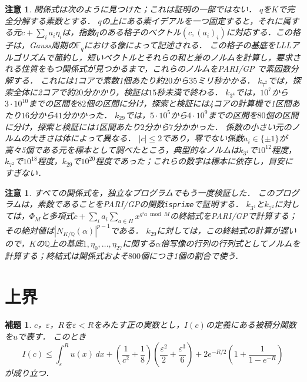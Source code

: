 \documentclass[11pt,a4paper]{ltjsarticle}
\theoremstyle{ja}
\newtheorem{lemma}[theorem]{補題}
\newtheorem{remark}[theorem]{注意}
\begin{document}
\begin{remark} \label{rem:search}
関係式は次のように見つけた；これは証明の一部ではない．
$q$を$K$で完全分解する素数とする．
$q$の上にある素イデアルを一つ固定すると，それに属する元$c + \sum_i a_i \eta_i$は，指数$q$のある格子のベクトル$(c, (a_i)_i)$に対応する．この格子は，Gauss周期の$\mathbb{F}_q$における像によって記述される．
この格子の基底をLLLアルゴリズムで簡約し，短いベクトルとそれらの和と差のノルムを計算し，要求される性質をもつ関係式が見つかるまで，これらのノルムをPARI/GP \cite{PARI}で素因数分解する．
これには1コアで素数1個あたり約$20$から$35$ミリ秒かかる．
$k_{7^2}$では，探索全体に2コアで約$20$分かかり，検証は$15$秒未満で終わる．
$k_{3^4}$では，$10^7$から$3 \cdot 10^{10}$までの区間を$82$個の区間に分け，探索と検証には4コアの計算機で1区間あたり$16$分から$41$分かかった．
$k_{29}$では，$5 \cdot 10^5$から$4 \cdot 10^9$までの区間を$80$個の区間に分け，探索と検証には1区間あたり$2$分から$7$分かかった．
係数の小さい元のノルムの大きさは体によって異なる．
$|c| \le 2$であり，零でない係数$a_i \in \{\pm 1\}$が高々5個である元を標本として調べたところ，典型的なノルムは$k_{3^4}$で$10^{12}$程度，$k_{7^2}$で$10^{18}$程度，$k_{29}$で$10^{20}$程度であった；これらの数字は標本に依存し，目安にすぎない．
\end{remark}

\begin{remark} \label{rem:second}
すべての関係式を，独立なプログラムでもう一度検証した．
このプログラムは，素数であることをPARI/GPの関数\texttt{isprime}で証明する．
$k_{3^4}$と$k_{7^2}$に対しては，$\Phi_M$と多項式$c + \sum_i a_i \sum_{a \in H} x^{g^i a \bmod M}$の終結式をPARI/GPで計算する；その絶対値は$|N_{K/\mathbb{Q}}(\alpha)|^{p-1}$である．
$k_{29}$に対しては，この終結式の計算が遅いので，$K$の$\mathbb{Q}$上の基底$1, \eta_0, \ldots, \eta_{27}$に関する$\alpha$倍写像の行列の行列式としてノルムを計算する；終結式は関係式およそ$800$個につき1個の割合で使う．
\end{remark}

\section{上界} \label{sec:bound}

\begin{lemma} \label{lem:integral}
$c$，$\varepsilon$，$R$を$\varepsilon < R$をみたす正の実数とし，$I(c)$の定義にある被積分関数を$u$で表す．
このとき
\[
I(c) \le \int_\varepsilon^R u(x)\, dx + \left( \frac{1}{c^2} + \frac{1}{8} \right) \left( \frac{\varepsilon^2}{2} + \frac{\varepsilon^3}{6} \right) + 2 e^{-R/2} \left( 1 + \frac{1}{1 - e^{-R}} \right)
\]
が成り立つ．
\end{lemma}
\end{document}
